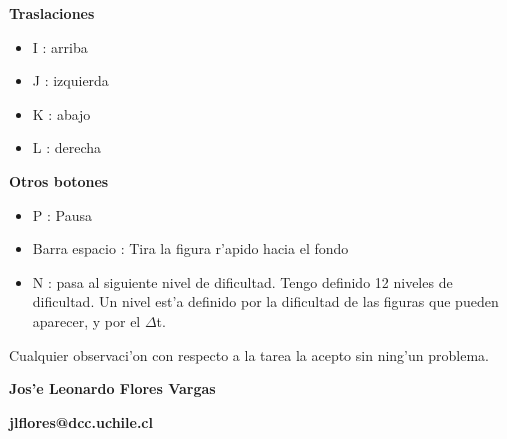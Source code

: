  
{\bf Traslaciones}  
\begin{itemize}   
   \item  I : arriba
    \item J : izquierda
    \item K : abajo
      \item L : derecha
  
\end{itemize}

 
{\bf Otros botones} 
\begin{itemize}  
    \item P : Pausa
    \item Barra espacio : Tira la figura  r'apido hacia el fondo
    \item N : pasa al siguiente nivel de dificultad. Tengo definido 12 niveles de dificultad.
             Un nivel est'a definido por la dificultad de las figuras que pueden aparecer, y por el $\Delta$t.
\end{itemize}


 


Cualquier observaci'on con respecto a la tarea la acepto sin ning'un problema.

{\bf Jos'e Leonardo Flores Vargas }
  
{\bf jlflores@dcc.uchile.cl}


